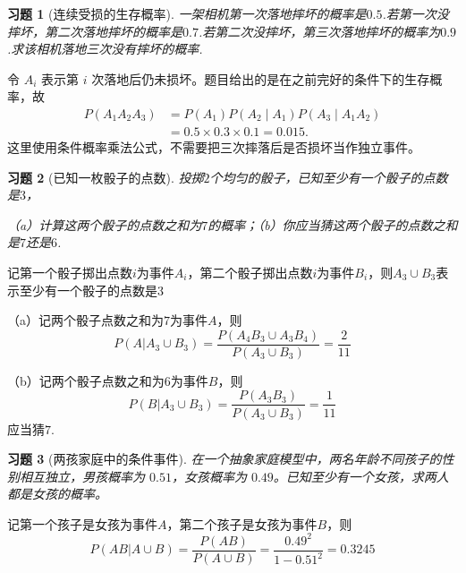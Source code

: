 \documentclass[UTF8,12pt,a4paper,fontset=fandol]{ctexart}
\newtheorem{exercise}{习题}[section]
\begin{document}
\begin{exercise}[连续受损的生存概率]\label{q:Y2.12}
一架相机第一次落地摔坏的概率是$0.5$.若第一次没摔坏，第二次落地摔坏的概率是$0.7$.若第二次没摔坏，第三次落地摔坏的概率为$0.9$.求该相机落地三次没有摔坏的概率.\par{}
\end{exercise}

\begin{solve}\label{a:Y2.12}令 $A_i$ 表示第 $i$ 次落地后仍未损坏。题目给出的是在之前完好的条件下的生存概率，故\[\begin{aligned}P(A_1A_2A_3)&=P(A_1)P(A_2\mid A_1)P(A_3\mid A_1A_2)\\&=0.5\times0.3\times0.1=0.015.\end{aligned}\]这里使用条件概率乘法公式，不需要把三次摔落后是否损坏当作独立事件。\end{solve}

\begin{exercise}[已知一枚骰子的点数]\label{q:Y2.13}
投掷$2$个均匀的骰子，已知至少有一个骰子的点数是$3$，

（a）计算这两个骰子的点数之和为$7$的概率；（b）你应当猜这两个骰子的点数之和是$7$还是$6$.\par{}
\end{exercise}

\begin{solve}\label{a:Y2.13}
记第一个骰子掷出点数$i$为事件$A_i$，第二个骰子掷出点数$i$为事件$B_i$，则$A_3\cup B_3$表示至少有一个骰子的点数是$3$

（a）记两个骰子点数之和为$7$为事件$A$，则
\[P(A|{A_3} \cup {B_3}) = \frac{{P({A_4}{B_3} \cup {A_3}{B_4})}}{{P({A_3} \cup {B_3})}} = \frac{2}{{11}}\]

（b）记两个骰子点数之和为$6$为事件$B$，则
\[P(B|{A_3} \cup {B_3}) = \frac{{P({A_3}{B_3})}}{{P({A_3} \cup {B_3})}} = \frac{1}{{11}}\]
应当猜$7$.
\end{solve}

\begin{exercise}[两孩家庭中的条件事件]\label{q:Y2.15}
在一个抽象家庭模型中，两名年龄不同孩子的性别相互独立，男孩概率为 $0.51$，女孩概率为 $0.49$。已知至少有一个女孩，求两人都是女孩的概率。\par{}
\end{exercise}

\begin{solve}\label{a:Y2.15}
记第一个孩子是女孩为事件$A$，第二个孩子是女孩为事件$B$，则
\[P(AB|A \cup B) = \frac{{P(AB)}}{{P(A \cup B)}} = \frac{{{{0.49}^2}}}{{1 - {{0.51}^2}}} = 0.3245\]
\end{solve}
\end{document}
